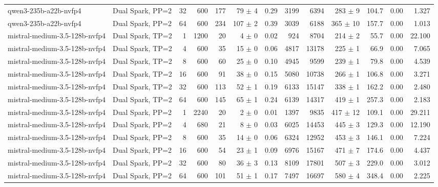 \begin{tabular}{l l r r r r r r r r r r r}
qwen3-235b-a22b-nvfp4 & Dual Spark, PP=2 & 32 & 600 & 177 & 79 $\pm$ 4 & 0.29 & 3199 & 6394 & 283 $\pm$ 9 & 104.7 & 0.00 & 1.327 \\
qwen3-235b-a22b-nvfp4 & Dual Spark, PP=2 & 64 & 600 & 234 & 107 $\pm$ 2 & 0.39 & 3039 & 6188 & 365 $\pm$ 10 & 157.7 & 0.00 & 1.013 \\
\addlinespace
mistral-medium-3.5-128b-nvfp4 & Dual Spark, TP=2 & 1 & 1200 & 20\rlap{$^\dagger$} & 4 $\pm$ 0 & 0.02 & 924 & 8704 & 214 $\pm$ 2 & 55.7 & 0.00 & 22.100 \\
mistral-medium-3.5-128b-nvfp4 & Dual Spark, TP=2 & 4 & 600 & 35\rlap{$^\dagger$} & 15 $\pm$ 0 & 0.06 & 4817 & 13178 & 225 $\pm$ 1 & 66.9 & 0.00 & 7.065 \\
mistral-medium-3.5-128b-nvfp4 & Dual Spark, TP=2 & 8 & 600 & 60\rlap{$^\dagger$} & 25 $\pm$ 0 & 0.10 & 4945 & 9599 & 239 $\pm$ 1 & 79.8 & 0.00 & 4.539 \\
mistral-medium-3.5-128b-nvfp4 & Dual Spark, TP=2 & 16 & 600 & 91\rlap{$^\dagger$} & 38 $\pm$ 0 & 0.15 & 5080 & 10738 & 266 $\pm$ 1 & 106.8 & 0.00 & 3.271 \\
mistral-medium-3.5-128b-nvfp4 & Dual Spark, TP=2 & 32 & 600 & 113 & 52 $\pm$ 1 & 0.19 & 6133 & 15147 & 338 $\pm$ 1 & 162.2 & 0.00 & 2.480 \\
mistral-medium-3.5-128b-nvfp4 & Dual Spark, TP=2 & 64 & 600 & 145 & 65 $\pm$ 1 & 0.24 & 6139 & 14317 & 419 $\pm$ 1 & 257.3 & 0.00 & 2.183 \\
\addlinespace
mistral-medium-3.5-128b-nvfp4 & Dual Spark, PP=2 & 1 & 2240 & 20\rlap{$^\dagger$} & 2 $\pm$ 0 & 0.01 & 1397 & 9835 & 417 $\pm$ 12 & 109.1 & 0.00 & 29.211 \\
mistral-medium-3.5-128b-nvfp4 & Dual Spark, PP=2 & 4 & 680 & 21\rlap{$^\dagger$} & 8 $\pm$ 0 & 0.03 & 6025 & 14453 & 445 $\pm$ 3 & 129.3 & 0.00 & 12.190 \\
mistral-medium-3.5-128b-nvfp4 & Dual Spark, PP=2 & 8 & 600 & 35\rlap{$^\dagger$} & 14 $\pm$ 0 & 0.06 & 6324 & 12952 & 453 $\pm$ 3 & 146.1 & 0.00 & 7.224 \\
mistral-medium-3.5-128b-nvfp4 & Dual Spark, PP=2 & 16 & 600 & 54\rlap{$^\dagger$} & 23 $\pm$ 1 & 0.09 & 6976 & 15167 & 471 $\pm$ 7 & 174.6 & 0.00 & 4.437 \\
mistral-medium-3.5-128b-nvfp4 & Dual Spark, PP=2 & 32 & 600 & 80\rlap{$^\dagger$} & 36 $\pm$ 3 & 0.13 & 8109 & 17801 & 507 $\pm$ 3 & 229.0 & 0.00 & 3.012 \\
mistral-medium-3.5-128b-nvfp4 & Dual Spark, PP=2 & 64 & 600 & 101\rlap{$^\dagger$} & 51 $\pm$ 1 & 0.17 & 7497 & 16697 & 580 $\pm$ 4 & 348.4 & 0.00 & 2.225 \\

\end{tabular}
